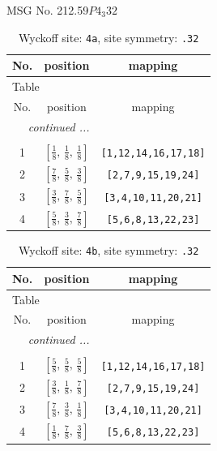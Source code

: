 \documentclass[fleqn,8pt]{jsarticle}
\begin{document}
\setcounter{MaxMatrixCols}{32}

\renewcommand{\tablename}{Table~}
\renewcommand{\figurename}{Figure~}
\begin{center}
\LARGE
MSG No. 212.59\quad$P4_{3}32$
\end{center}
\renewcommand{\arraystretch}{1.2}
\begin{longtable}{ccc}
\caption{Wyckoff site: {\tt 4a}, site symmetry: {\tt .32}}
 \\
 \hline \hline
No. & position & mapping \\ \hline \endfirsthead

\multicolumn{2}{l}{\tablename\ \thetable{}} \\
 \hline \hline
No. & position & mapping \\ \hline \endhead

 \hline \hline
\multicolumn{2}{r}{\footnotesize\it continued ...} \\ \endfoot

 \hline \hline
\multicolumn{2}{r}{} \\ \endlastfoot

1 & $\left[ \frac{1}{8},\, \frac{1}{8},\, \frac{1}{8} \right]$ & {\tt [1,12,14,16,17,18]} \\ \hline
2 & $\left[ \frac{7}{8},\, \frac{5}{8},\, \frac{3}{8} \right]$ & {\tt [2,7,9,15,19,24]} \\ \hline
3 & $\left[ \frac{3}{8},\, \frac{7}{8},\, \frac{5}{8} \right]$ & {\tt [3,4,10,11,20,21]} \\ \hline
4 & $\left[ \frac{5}{8},\, \frac{3}{8},\, \frac{7}{8} \right]$ & {\tt [5,6,8,13,22,23]} \\
\end{longtable}
\renewcommand{\arraystretch}{1.2}
\begin{longtable}{ccc}
\caption{Wyckoff site: {\tt 4b}, site symmetry: {\tt .32}}
 \\
 \hline \hline
No. & position & mapping \\ \hline \endfirsthead

\multicolumn{2}{l}{\tablename\ \thetable{}} \\
 \hline \hline
No. & position & mapping \\ \hline \endhead

 \hline \hline
\multicolumn{2}{r}{\footnotesize\it continued ...} \\ \endfoot

 \hline \hline
\multicolumn{2}{r}{} \\ \endlastfoot

1 & $\left[ \frac{5}{8},\, \frac{5}{8},\, \frac{5}{8} \right]$ & {\tt [1,12,14,16,17,18]} \\ \hline
2 & $\left[ \frac{3}{8},\, \frac{1}{8},\, \frac{7}{8} \right]$ & {\tt [2,7,9,15,19,24]} \\ \hline
3 & $\left[ \frac{7}{8},\, \frac{3}{8},\, \frac{1}{8} \right]$ & {\tt [3,4,10,11,20,21]} \\ \hline
4 & $\left[ \frac{1}{8},\, \frac{7}{8},\, \frac{3}{8} \right]$ & {\tt [5,6,8,13,22,23]} \\
\end{longtable}
\end{document}
